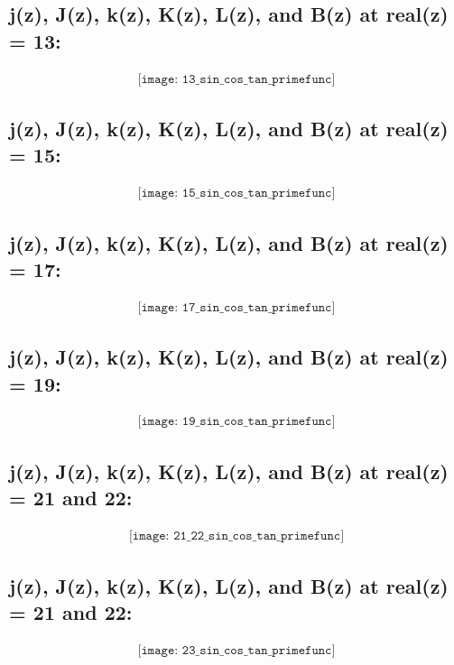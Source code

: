\documentclass{article}
\begin{document}
\subsection*{j(z), J(z), k(z), K(z), L(z), and B(z) at real(z) = 13:}
\begin{align*}
\texttt{[image: 13\_sin\_cos\_tan\_primefunc]}
\end{align*}

\subsection*{j(z), J(z), k(z), K(z), L(z), and B(z) at real(z) = 15:}
\begin{align*}
\texttt{[image: 15\_sin\_cos\_tan\_primefunc]}
\end{align*}

\subsection*{j(z), J(z), k(z), K(z), L(z), and B(z) at real(z) = 17:}
\begin{align*}
\texttt{[image: 17\_sin\_cos\_tan\_primefunc]}
\end{align*}

\subsection*{j(z), J(z), k(z), K(z), L(z), and B(z) at real(z) = 19:}
\begin{align*}
\texttt{[image: 19\_sin\_cos\_tan\_primefunc]}
\end{align*}

\subsection*{j(z), J(z), k(z), K(z), L(z), and B(z) at real(z) = 21 and 22:}
\begin{align*}
\texttt{[image: 21\_22\_sin\_cos\_tan\_primefunc]}
\end{align*}

\subsection*{j(z), J(z), k(z), K(z), L(z), and B(z) at real(z) = 21 and 22:}
\begin{align*}
\texttt{[image: 23\_sin\_cos\_tan\_primefunc]}
\end{align*}
\end{document}
